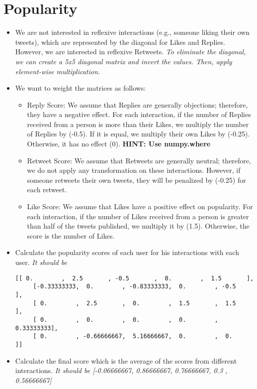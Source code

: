 \documentclass[11pt, a4paper]{article}
\newcommand{\cmt}[1]{\textit{\color{red}#1}}
\begin{document}
\section*{Popularity}

\begin{itemize}
	\item We are not interested in reflexive interactions (e.g., someone liking their own tweets), which are represented by the diagonal for Likes and Replies. However, we are interested in reflexive Retweets.
	\textit{To eliminate the diagonal, we can create a 5x5 diagonal matrix and invert the values. Then, apply element-wise multiplication.}
	\item We want to weight the matrices as follows:
	\begin{itemize}
		\item Reply Score: We assume that Replies are generally objections; therefore, they have a negative effect. For each interaction, if the number of Replies received from a person is more than their Likes, we multiply the number of Replies by (-0.5). If it is equal, we multiply their own Likes by (-0.25). Otherwise, it has no effect (0). \textbf{HINT: Use numpy.where}
		\item Retweet Score: We assume that Retweets are generally neutral; therefore, we do not apply any transformation on these interactions. However, if someone retweets their own tweets, they will be penalized by (-0.25) for each retweet.
		\item Like Score: We assume that Likes have a positive effect on popularity. For each interaction, if the number of Likes received from a person is greater than half of the tweets published, we multiply it by (1.5). Otherwise, the score is the number of Likes.
	\end{itemize}
	\item Calculate the popularity scores of each user for his interactions with each user.
	\cmt{It should be}
	\begin{Verbatim}[fontsize=\small, formatcom=\color{red}]
	[[ 0.        ,  2.5       , -0.5       ,  0.        ,  1.5       ],
	 [-0.33333333,  0.        , -0.83333333,  0.        , -0.5       ],
	 [ 0.        ,  2.5       ,  0.        ,  1.5       ,  1.5       ],
	 [ 0.        ,  0.        ,  0.        ,  0.        ,  0.33333333],
	 [ 0.        , -0.66666667,  5.16666667,  0.        ,  0.        ]]
	\end{Verbatim}
	\item Calculate the final score which is the average of the scores from different interactions.
	\cmt{It should be [-0.06666667,  0.86666667,  0.76666667,  0.3       ,  0.56666667]}
\end{itemize}
\end{document}
